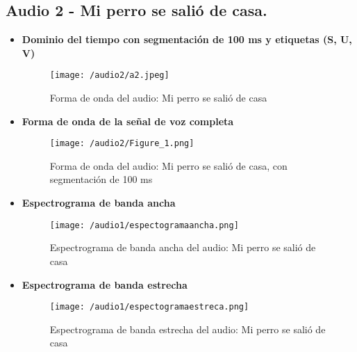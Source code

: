 \documentclass{report}
\begin{document}
\subsection{Audio 2 - Mi perro se salió de casa.}
\begin{itemize}
    \item \textbf{Dominio del tiempo con segmentación de 100 ms y etiquetas (S, U, V)}
    \begin{figure}[h]
        \centering
        \texttt{[image: /audio2/a2.jpeg]}
        \caption{Forma de onda del audio: Mi perro se salió de casa}
        \label{fig:forma_onda_audio2div}
    \end{figure}
    \item \textbf{Forma de onda de la señal de voz completa}
    \begin{figure}[h]
        \centering
        \texttt{[image: /audio2/Figure\_1.png]}
        \caption{Forma de onda del audio: Mi perro se salió de casa, con segmentación de 100 ms}
        \label{fig:forma_onda_audio1}
    \end{figure}
    \newpage
    \item \textbf{Espectrograma de banda ancha}
    \begin{figure}[h]
        \centering
        \texttt{[image: /audio1/espectogramaancha.png]}
        \caption{Espectrograma de banda ancha del audio: Mi perro se salió de casa}
        \label{fig:espectograma banda ancha audio1}
    \end{figure}
    \item \textbf{Espectrograma de banda estrecha}
    \begin{figure}[h]
        \centering
        \texttt{[image: /audio1/espectogramaestreca.png]}
        \caption{Espectrograma de banda estrecha del audio: Mi perro se salió de casa}
        \label{fig:espectograma banda estrecha audio1}
    \end{figure}
\end{itemize}
\newpage
\end{document}
